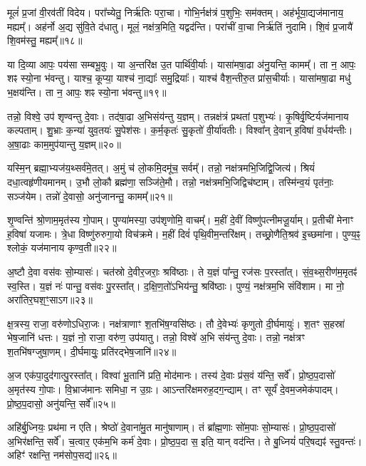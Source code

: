 मूलं॑ प्र॒जां वी॒रव॑तीं विदेय। परा᳚च्येतु॒ निर्ऋ॑तिः परा॒चा। गोभि॒र्नक्ष॑त्रं प॒शुभिः॒ सम॑क्तम्। अह॑र्भूया॒द्यज॑मानाय॒ मह्यम्᳚। अह॑र्नो अ॒द्य सु॑वि॒ते द॑धातु। मूलं॒ नक्ष॑त्र॒मिति॒ यद्वद॑न्ति। परा॑चीं वा॒चा निर्ऋ॑तिं नुदामि। शि॒वं प्र॒जायै॑ शि॒वम॑स्तु॒ मह्यम्᳚॥१८॥ 

या दि॒व्या आपः॒ पय॑सा सम्बभू॒वुः। या अ॒न्तरि॑क्ष उ॒त पार्थि॑वी॒र्याः। यासा॑मषा॒ढा अ॑नु॒यन्ति॒ कामम्᳚। ता न॒ आपः॒ शꣴ स्यो॒ना भ॑वन्तु। याश्च॒ कूप्या॒ याश्च॑ ना॒द्याः᳚ समु॒द्रियाः᳚। याश्च॑ वैश॒न्तीरु॒त प्रा॑स॒चीर्याः। यासा॑मषा॒ढा मधु॑ भ॒क्षय॑न्ति। ता न॒ आपः॒ शꣴ स्यो॒ना भ॑वन्तु॥१९॥ 

तन्नो॒ विश्वे॒ उप॑ शृण्वन्तु दे॒वाः। तद॑षा॒ढा अ॒भिसंय॑न्तु य॒ज्ञम्। तन्नक्ष॑त्रं प्रथतां प॒शुभ्यः॑। कृ॒षिर्वृ॒ष्टिर्यज॑मानाय कल्पताम्। शु॒भ्राः क॒न्या॑ युव॒तयः॑ सु॒पेश॑सः। क॒र्म॒कृतः॑ सु॒कृतो॑ वी॒र्या॑वतीः। विश्वा᳚न् दे॒वान् ह॒विषा॑ व॒र्धय॑न्तीः। अ॒षा॒ढाः काम॒मुप॑यान्तु य॒ज्ञम्॥२०॥ 

यस्मि॒न् ब्रह्मा॒भ्यज॑य॒थ्सर्व॑मे॒तत्। अ॒मुं च॑ लो॒कमि॒दमू॑च॒ सर्वम्᳚। तन्नो॒ नक्ष॑त्रमभि॒जिद्वि॒जित्य॑। श्रियं॑ दधा॒त्वहृ॑णीय\-मानम्। उ॒भौ लो॒कौ ब्रह्म॑णा॒ सञ्जि॑ते॒मौ। तन्नो॒ नक्ष॑त्रमभि॒जिद्विच॑ष्टाम्। तस्मि॑न्व॒यं पृत॑नाः॒ सञ्ज॑येम। तन्नो॑ दे॒वासो॒ अनु॑जानन्तु॒ कामम्᳚॥२१॥ 

शृ॒ण्वन्ति॑ श्रो॒णाम॒मृत॑स्य गो॒पाम्। पुण्या॑मस्या॒ उप॑शृणोमि॒ वाचम्᳚। म॒हीं दे॒वीं विष्णु॑पत्नीमजू॒र्याम्। प्र॒तीची॑ मेनाꣳ ह॒विषा॑ यजामः। त्रे॒धा विष्णु॑रुरुगा॒यो विच॑क्रमे। म॒हीं दिवं॑ पृथि॒वीम॒न्तरि॑क्षम्। तच्छ्रो॒णैति॒श्रव॑ इ॒च्छमा॑ना। पुण्य॒ꣴ॒ श्लोकं॒ यज॑मानाय कृण्व॒ती॥२२॥ 

अ॒ष्टौ दे॒वा वस॑वः सो॒म्यासः॑। चत॑स्रो दे॒वीर॒जराः॒ श्रवि॑ष्ठाः। ते य॒ज्ञं पा᳚न्तु॒ रज॑सः प॒रस्ता᳚त्। सं॒व॒थ्स॒रीण॑म॒मृतꣴ॑ स्व॒स्ति। य॒ज्ञं नः॑ पान्तु॒ वस॑वः पु॒रस्ता᳚त्। द॒क्षि॒ण॒तो॑ऽभिय॑न्तु॒ श्रवि॑ष्ठाः। पुण्यं॒ नक्ष॑त्रम॒भि संवि॑शाम। मा नो॒ अरा॑तिर॒घश॒ꣳ॒साऽग\snn{}॥२३॥ 

क्ष॒त्रस्य॒ राजा॒ वरु॑णोऽधिरा॒जः। नक्ष॑त्राणाꣳ श॒तभि॑ष॒ग्वसि॑ष्ठः। तौ दे॒वेभ्यः॑ कृणुतो दी॒र्घमायुः॑। श॒तꣳ स॒हस्रा॑ भेष॒जानि॑ धत्तः। य॒ज्ञं नो॒ राजा॒ वरु॑ण॒ उप॑यातु। तन्नो॒ विश्वे॑ अ॒भि संय॑न्तु दे॒वाः। तन्नो॒ नक्ष॑त्रꣳ श॒तभि॑षग्जुषा॒णम्। दी॒र्घमायुः॒ प्रति॑रद्भेष॒जानि॑॥२४॥ 

अ॒ज एक॑पा॒दुद॑गात्पु॒रस्ता᳚त्। विश्वा॑ भू॒तानि॑ प्रति॒ मोद॑मानः। तस्य॑ दे॒वाः प्र॑स॒वं य॑न्ति॒ सर्वे᳚। प्रो॒ष्ठ॒प॒दासो॑ अ॒मृत॑स्य गो॒पाः। वि॒भ्राज॑मानः समिधा॒ न उ॒ग्रः। आऽन्तरि॑क्षमरुह॒दग॒न्द्याम्। तꣳ सूर्यं॑ दे॒वम॒जमेक॑पादम्। प्रो॒ष्ठ॒प॒दासो॒ अनु॑यन्ति॒ सर्वे᳚॥२५॥ 

अहि॑र्बु॒ध्नियः॒ प्रथ॑मा न एति। श्रेष्ठो॑ दे॒वाना॑मु॒त मानु॑षाणाम्। तं ब्रा᳚ह्म॒णाः सो॑म॒पाः सो॒म्यासः॑। प्रो॒ष्ठ॒प॒दासो॑ अ॒भिर॑क्षन्ति॒ सर्वे᳚। च॒त्वार॒ एक॑म॒भि कर्म॑ दे॒वाः। प्रो॒ष्ठ॒प॒दा स॒ इति॒ यान् वद॑न्ति। ते बु॒ध्नियं॑ परि॒षद्यꣴ॑ स्तु॒वन्तः॑। अहिꣳ॑ रक्षन्ति॒ नम॑सोप॒सद्य॑॥२६॥ 

